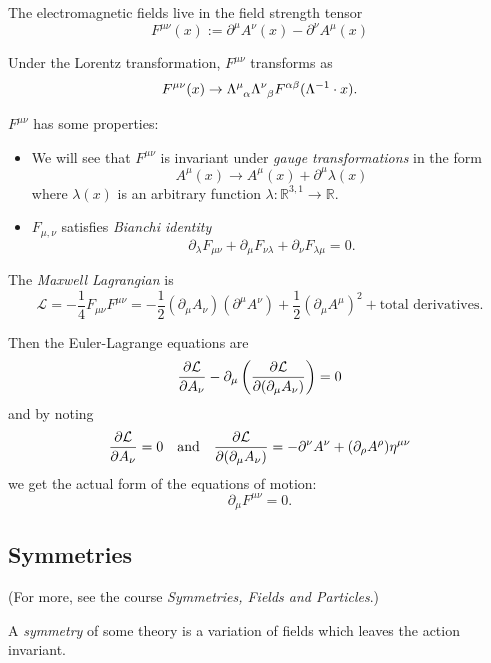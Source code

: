 \documentclass[a4paper,11pt]{article}
\begin{document}
	The electromagnetic fields live in the field strength tensor
	\begin{equation}
		F^{\mu\nu}(x) := \partial^\mu A^\nu(x) - \partial^\nu A^\mu(x)
	\end{equation}

	Under the Lorentz transformation, $F^{\mu\nu}$ transforms as 
	\begin{equation}
		F^{\mu\nu}(x) \to \LT{\mu}{\alpha}\LT{\nu}{\beta}F^{\alpha\beta}(\Lambda^{-1} \cdot x).
	\end{equation}

	$F^{\mu\nu}$ has some properties:
	\begin{itemize}
		\item We will see that $F^{\mu\nu}$ is invariant under \emph{gauge transformations} in the form 
		\begin{equation}
			A^\mu(x) \to A^\mu(x) + \partial^\mu \lambda(x)
		\end{equation} 
		where $\lambda(x)$ is an arbitrary function $\lambda : \mathbb{R}^{3,1} \to \mathbb{R}$.
		\item $F_{\mu,\nu}$ satisfies \emph{Bianchi identity}  \begin{equation}
			\partial_\lambda F_{\mu\nu} + \partial_\mu F_{\nu\lambda} + \partial_\nu F_{\lambda\mu} = 0.
		\end{equation}
	\end{itemize}

	The \emph{Maxwell Lagrangian} is 
	\begin{equation}
		\mathcal{L} = - \frac{1}{4} F_{\mu\nu} F^{\mu\nu} = - \frac{1}{2} (\partial_\mu A_\nu)(\partial^\mu A^\nu) + \frac{1}{2} (\partial_\mu A^\mu)^2 + \text{total derivatives}.
	\end{equation}

	Then the Euler-Lagrange equations are
	\[
		\pdv{\mathcal{L}}{A_\nu} - \partial_\mu \left( \pdv{\mathcal{L}}{(\partial_\mu A_\nu)} \right) = 0
	\]
	and by noting
	\[
		\pdv{\mathcal{L}}{A_\nu} = 0 \quad \text{and} \quad \pdv{\mathcal{L}}{(\partial_\mu A_\nu)} = - \partial^\nu A^\nu + (\partial_\rho A^\rho)\eta^{\mu\nu}
	\]
	we get the actual form of the equations of motion:
	\begin{equation}
		\partial_\mu F^{\mu\nu} = 0.
	\end{equation}

	\subsection{Symmetries}
	(For more, see the course \emph{Symmetries, Fields and Particles}.)
	\begin{defi}
		A \emph{symmetry} of some theory is a variation of fields which leaves the action invariant.
	\end{defi}
\end{document}
